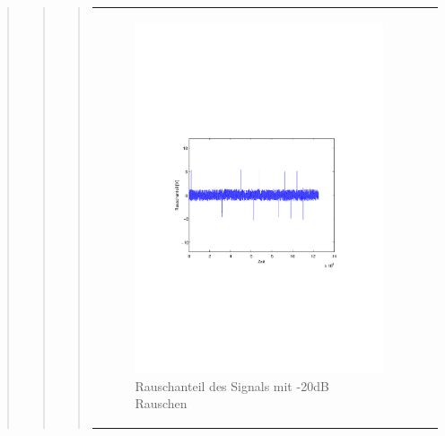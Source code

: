 \begin{quote}
\begin{quote}
\begin{quote}
            
        \begin{center}
        \begin{tabular}{ll}
        
        \hspace{-16.5em}
            \begin{minipage}{0.6\textwidth}
                
                \begin{figure}[H]
                    \label{fig:rau20}
                    \includegraphics[scale=0.7, trim = 20mm 80mm 20mm 90mm, clip]{Bilder/rau20}
                    \caption{Rauschanteil des Signals mit -20dB Rauschen}
                \end{figure}
        
            \end{minipage}
        

\end{tabular}
\end{center}
\end{quote}
\end{quote}
\end{quote}
